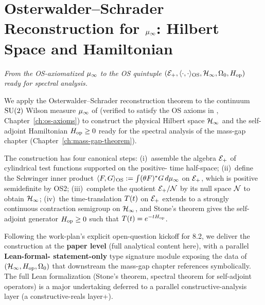 %

\chapter{Osterwalder--Schrader Reconstruction
  for \texorpdfstring{$\mu_\infty$}{mu\_infinity}:
  Hilbert Space and Hamiltonian}
\label{ch:os-reconstruction}

\noindent\emph{From the OS-axiomatized $\mu_\infty$ to the OS quintuple
$(\mathcal{E}_+, \langle \cdot, \cdot \rangle_{\mathrm{OS}}, \mathcal{H}_\infty, \Omega_0, H_{\mathrm{op}})$ ready for
spectral analysis.}

We apply the Osterwalder--Schrader reconstruction theorem to the
continuum $\mathrm{SU}(2)$ Wilson measure $\mu_\infty$ of  (verified
to satisfy the OS axioms in ,
Chapter~\ref{ch:os-axioms}) to construct the physical Hilbert space
$\mathcal{H}_\infty$ and the self-adjoint Hamiltonian $H_{\mathrm{op}} \ge 0$ ready for the
spectral analysis of the mass-gap chapter (Chapter~\ref{ch:mass-gap-theorem}).

The construction has four canonical steps: (i)~assemble the algebra
$\mathcal{E}_+$ of cylindrical test functions supported on the positive-
time half-space; (ii)~define the Schwinger inner product
$\langle F, G \rangle_{\mathrm{OS}} := \int (\theta F)^* G \, d\mu_\infty$ on $\mathcal{E}_+$, which
is positive semidefinite by OS2; (iii)~complete the quotient
$\mathcal{E}_+ / \mathcal{N}$ by its null space $\mathcal{N}$ to obtain $\mathcal{H}_\infty$;
(iv)~the time-translation $T(t)$ on $\mathcal{E}_+$ extends to a strongly
continuous contraction semigroup on $\mathcal{H}_\infty$, and Stone's theorem
gives the self-adjoint generator
$H_{\mathrm{op}} \ge 0$ such that $T(t) = e^{-tH_{\mathrm{op}}}$.

Following the work-plan's explicit open-question kickoff for 8.2,
we deliver the construction at the \textbf{paper level} (full
analytical content here), with a parallel \textbf{Lean-formal-
statement-only} type signature module
 exposing the
data of $(\mathcal{H}_\infty, H_{\mathrm{op}}, \Omega_0)$ that downstream the mass-gap chapter
references symbolically.  The full Lean formalization (Stone's
theorem, spectral theorem for self-adjoint operators) is a major
undertaking deferred to a parallel constructive-analysis layer
(a constructive-reals layer+).

